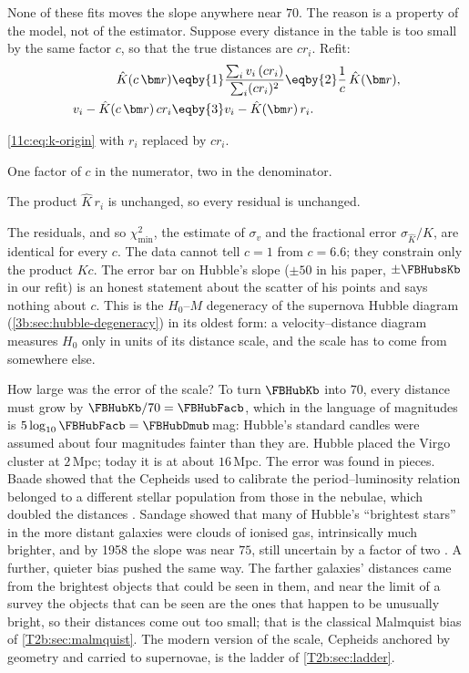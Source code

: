 None of these fits moves the slope anywhere near $70$. The reason is a property of
the model, not of the estimator. Suppose every distance in the table is too small
by the same factor $c$, so that the true distances are $cr_i$. Refit:
\begin{align}
  \hat K(c\,\bm r)
  &\eqby{1}\frac{\sum_iv_i\,(cr_i)}{\sum_i(cr_i)^2}
   \eqby{2}\frac{1}{c}\,\hat K(\bm r),
  \nonumber\\
  v_i-\hat K(c\,\bm r)\,cr_i
  &\eqby{3}v_i-\hat K(\bm r)\,r_i .
  \label{11c:eq:scale-invisible}
\end{align}
\begin{explain}
  \item \eqref{11c:eq:k-origin} with $r_i$ replaced by $cr_i$.
  \item One factor of $c$ in the numerator, two in the denominator.
  \item The product $\hat K\,r_i$ is unchanged, so every residual is unchanged.
\end{explain}
The residuals, and so $\chi^2_{\min}$, the estimate of $\sigma_v$ and the fractional
error $\sigma_{\hat K}/\hat K$, are identical for every $c$. The data cannot tell
$c=1$ from $c=6.6$; they constrain only the product $Kc$. The error bar on
Hubble's slope ($\pm50$ in his paper, $\pm\FBHubsKb$ in our refit) is an honest statement about the scatter of his points and says
nothing about $c$. This is the $H_0$--$M$ degeneracy of the supernova Hubble
diagram (\cref{3b:sec:hubble-degeneracy}) in its oldest form: a velocity--distance
diagram measures $H_0$ only in units of its distance scale, and the scale has to
come from somewhere else.

How large was the error of the scale? To turn $\FBHubKb$ into $70$, every distance
must grow by $\FBHubKb/70=\FBHubFacb$, which in the language of magnitudes is
$5\log_{10}\FBHubFacb=\FBHubDmub$\,mag: Hubble's standard candles were assumed
about four magnitudes fainter than they are. Hubble placed the Virgo cluster at
$2$\,Mpc; today it is at about $16$\,Mpc. The error was found in pieces. Baade
showed that the Cepheids used to calibrate the period--luminosity relation
belonged to a different stellar population from those in the nebulae, which
doubled the distances \cite{Baade1956}. Sandage showed that many of Hubble's
``brightest stars'' in the more distant galaxies were clouds of ionised gas,
intrinsically much brighter, and by 1958 the slope was near $75$, still uncertain
by a factor of two \cite{Sandage1958}. A further, quieter bias pushed the same way.
The farther galaxies' distances came from the brightest objects that could be
seen in them, and near the limit of a survey the objects that can be seen are the
ones that happen to be unusually bright, so their distances come out too small;
that is the classical Malmquist bias of \cref{T2b:sec:malmquist}. The modern
version of the scale, Cepheids anchored by geometry and carried to supernovae,
is the ladder of \cref{T2b:sec:ladder}.

